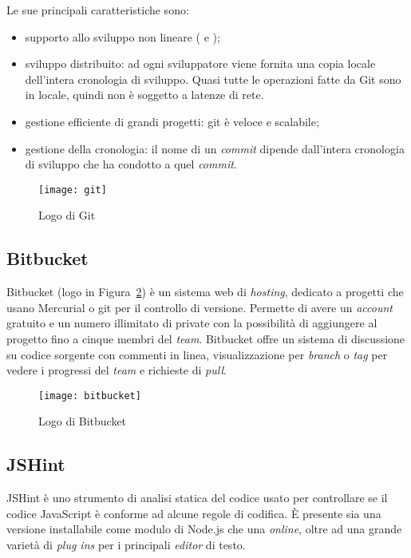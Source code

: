Le sue principali caratteristiche sono:
\begin{itemize}
\item supporto allo sviluppo non lineare ( e );
\item sviluppo distribuito: ad ogni sviluppatore viene fornita una copia locale dell'intera cronologia di sviluppo. Quasi tutte le operazioni fatte da Git sono in locale, quindi non è soggetto a latenze di rete.
\item gestione efficiente di grandi progetti: git è veloce e scalabile;
\item gestione della cronologia: il nome di un \textit{commit} dipende dall'intera cronologia di sviluppo che ha condotto a quel \textit{commit}.
\end{itemize}
\begin{figure}[h]
\begin{center}
\texttt{[image: git]}
\caption[Logo di Git]{Logo di Git\protect\footnotemark}
\label{fig:git}
\end{center}
\end{figure}

\subsection{Bitbucket}
Bitbucket (logo in Figura~\ref{fig:bitbucket}) è un sistema web di \textit{hosting}, dedicato a progetti che usano Mercurial o git per il controllo di versione. Permette di avere un \textit{account} gratuito e un numero illimitato di  private con la possibilità di aggiungere al progetto fino a cinque membri del \textit{team}. Bitbucket offre un sistema di discussione su codice sorgente con commenti in linea, visualizzazione per \textit{branch} o \textit{tag} per vedere i progressi del \textit{team} e richieste di \textit{pull}.
\begin{figure}[hbpc]
\begin{center}
\texttt{[image: bitbucket]}
\caption[Logo di Bitbucket]{Logo di Bitbucket\protect\footnotemark}
\label{fig:bitbucket}
\end{center}
\end{figure}

\subsection{JSHint}
JSHint è uno strumento di analisi statica del codice usato per controllare se il codice JavaScript è conforme ad alcune regole di codifica. È presente sia una versione installabile come modulo di Node.js che una \textit{online}, oltre ad una grande varietà di \textit{plug ins} per i principali \textit{editor} di testo.

